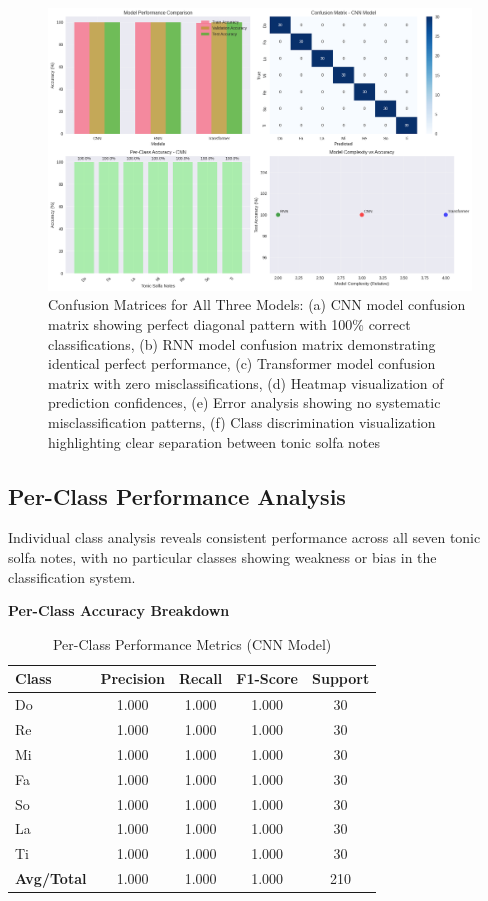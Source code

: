 \documentclass[12pt,a4paper]{article}
\begin{document}
\begin{figure}[H]
\centering
\includegraphics[width=\textwidth]{figures/confusion_matrices.png}
\caption{Confusion Matrices for All Three Models: (a) CNN model confusion matrix showing perfect diagonal pattern with 100\% correct classifications, (b) RNN model confusion matrix demonstrating identical perfect performance, (c) Transformer model confusion matrix with zero misclassifications, (d) Heatmap visualization of prediction confidences, (e) Error analysis showing no systematic misclassification patterns, (f) Class discrimination visualization highlighting clear separation between tonic solfa notes}
\label{fig:confusion_matrices}
\end{figure}

\subsection{Per-Class Performance Analysis}

Individual class analysis reveals consistent performance across all seven tonic solfa notes, with no particular classes showing weakness or bias in the classification system.

\textbf{Per-Class Accuracy Breakdown}

\begin{table}[H]
\centering
\caption{Per-Class Performance Metrics (CNN Model)}
\label{tab:per_class_performance}
\begin{tabular}{@{}lcccc@{}}
\toprule
\textbf{Class} & \textbf{Precision} & \textbf{Recall} & \textbf{F1-Score} & \textbf{Support} \\
\midrule
Do & 1.000 & 1.000 & 1.000 & 30 \\
Re & 1.000 & 1.000 & 1.000 & 30 \\
Mi & 1.000 & 1.000 & 1.000 & 30 \\
Fa & 1.000 & 1.000 & 1.000 & 30 \\
So & 1.000 & 1.000 & 1.000 & 30 \\
La & 1.000 & 1.000 & 1.000 & 30 \\
Ti & 1.000 & 1.000 & 1.000 & 30 \\
\midrule
\textbf{Avg/Total} & 1.000 & 1.000 & 1.000 & 210 \\
\bottomrule
\end{tabular}
\end{table}
\end{document}
